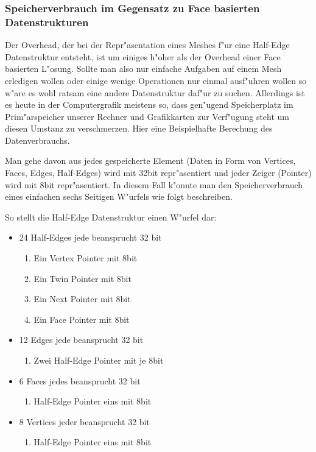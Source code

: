 \documentclass[pagesize, paper=a4, fontsize=12pt,titlepage=true, headings=small, headnosepline, abstractoff, liststotoc, nochapterprefix, plainheadsepline]{scrreprt}
\newcommand{\HES}{Half-Edge Datenstruktur }
\begin{document}
\subsubsection {Speicherverbrauch im Gegensatz zu Face basierten Datenstrukturen}
			Der Overhead, der bei der Repr"asentation eines Meshes f"ur eine \HES entsteht, ist um einiges h"oher als der Overhead einer Face basierten L"osung. Sollte man also nur einfache Aufgaben auf einem Mesh erledigen wollen oder einige wenige Operationen nur einmal ausf"uhren wollen so w"are es wohl ratsam eine andere Datenstruktur daf"ur zu suchen. Allerdings ist es heute in der Computergrafik meistens so, dass gen"ugend Speicherplatz im Prim"arspeicher unserer Rechner und Grafikkarten zur Verf"ugung steht um diesen Umstanz zu verschmerzen.
Hier eine Beispielhafte Berechung des Datenverbrauchs.
\newline

Man gehe davon aus jedes gespeicherte Element (Daten in Form von Vertices, Faces, Edges, Half-Edges) wird mit 32bit repr"asentiert und jeder Zeiger (Pointer) wird mit 8bit repr"asentiert. In diesem Fall k"onnte man den Speicherverbrauch eines einfachen sechs Seitigen W"urfels wie folgt beschreiben.

So stellt die \HES einen W"urfel dar:
\begin{itemize}
\item 24 Half-Edges jede beansprucht 32 bit
	\begin{enumerate}
    	\item Ein Vertex Pointer mit 8bit
    	\item Ein Twin Pointer mit 8bit
    	\item Ein Next Pointer mit 8bit
    	\item Ein Face Pointer mit 8bit
	\end{enumerate}
\item 12 Edges jede beansprucht 32 bit
	\begin{enumerate}
    	\item Zwei Half-Edge Pointer mit je 8bit
	\end{enumerate}
\item 6 Faces jedes beansprucht 32 bit
	\begin{enumerate}
    	\item Half-Edge Pointer eins mit 8bit
	\end{enumerate}
\item 8 Vertices jeder beansprucht 32 bit
	\begin{enumerate}
    	\item Half-Edge Pointer eins mit 8bit
	\end{enumerate}
\end{itemize}
\end{document}
